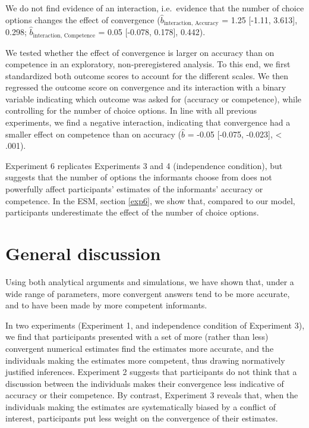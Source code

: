 \documentclass[
  doc,floatsintext]{apa6}
\begin{document}
We do not find evidence of an interaction, i.e.~evidence that the number of choice options changes the effect of convergence (\(\hat{b}_{\text{interaction, Accuracy}}\) = 1.25 {[}-1.11, 3.613{]}, 0.298; \(\hat{b}_{\text{interaction, Competence}}\) = 0.05 {[}-0.078, 0.178{]}, 0.442).

We tested whether the effect of convergence is larger on accuracy than on competence in an exploratory, non-preregistered analysis. To this end, we first standardized both outcome scores to account for the different scales. We then regressed the outcome score on convergence and its interaction with a binary variable indicating which outcome was asked for (accuracy or competence), while controlling for the number of choice options. In line with all previous experiments, we find a negative interaction, indicating that convergence had a smaller effect on competence than on accuracy (\(\hat{b}\) = -0.05 {[}-0.075, -0.023{]}, \textless{} .001).

Experiment 6 replicates Experiments 3 and 4 (independence condition), but suggests that the number of options the informants choose from does not powerfully affect participants' estimates of the informants' accuracy or competence. In the ESM, section \ref{exp6}, we show that, compared to our model, participants underestimate the effect of the number of choice options.

\section{General discussion}\label{general-discussion}

Using both analytical arguments and simulations, we have shown that, under a wide range of parameters, more convergent answers tend to be more accurate, and to have been made by more competent informants.

In two experiments (Experiment 1, and independence condition of Experiment 3), we find that participants presented with a set of more (rather than less) convergent numerical estimates find the estimates more accurate, and the individuals making the estimates more competent, thus drawing normatively justified inferences. Experiment 2 suggests that participants do not think that a discussion between the individuals makes their convergence less indicative of accuracy or their competence. By contrast, Experiment 3 reveals that, when the individuals making the estimates are systematically biased by a conflict of interest, participants put less weight on the convergence of their estimates.
\end{document}
